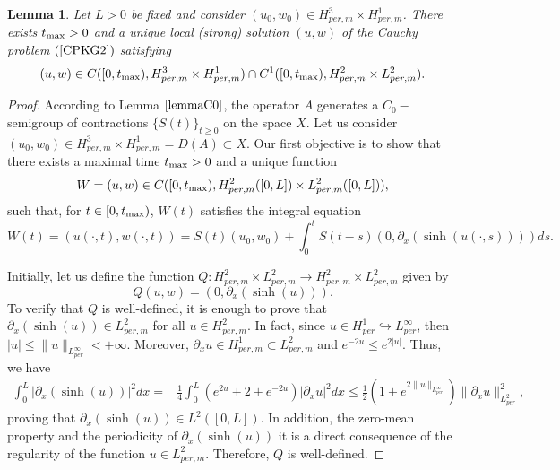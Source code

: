 \documentclass[12pt,reqno,a4paper]{amsart} %
\numberwithin{equation}{section}
\numberwithin{figure}{section}
\newtheorem{lemma}[theorem]{Lemma}
\begin{document}
\begin{lemma}\label{lwpthm1}
	Let $L>0$ be fixed and consider   $(u_0,w_0)\in H_{per,m}^3\times H_{per,m}^1$. There exists $t_{\rm{max}}>0$ and a unique local (strong) solution   $(u,w)$ of the Cauchy problem $(\ref{CPKG2})$ satisfying $$(u,w)\in C([0,t_{\rm{max}}),H_{per,m}^3\times H_{per,m}^1)\cap C^1([0,t_{\rm{max}}),H_{per,m}^2\times L_{per,m}^2) .$$
\end{lemma}
\begin{proof}	
	According to Lemma $\ref{lemmaC0}$, the operator $A$ generates a $C_0-$semigroup of 
	contractions $\{S(t)\}_{t\geq0}$ on the space $X$. Let us consider $(u_0,w_0)\in H_{per,m}^3\times H_{per,m}^1=D(A)\subset X$. Our first objective is to show that there exists a maximal time $t_{\rm{max}}>0$ and a unique function 
	\begin{equation}\label{eq1.lemma}
		W=(u,w)\in C([0,t_{\rm{max}}),H_{per,m}^2([0,L])\times L_{per,m}^2([0,L])), 
	\end{equation}
	such that, for $t\in [0,t_{\rm{max}})$, $W(t)$ satisfies the integral equation
	\begin{equation}\label{eq2.lemma}
		W(t)=(u(\cdot, t), w(\cdot, t))=S(t)(u_0,w_0)+\int_{0}^{t}S(t-s)(0,\partial_x(\sinh( u(\cdot,s))))ds. 
	\end{equation}
	
	Initially, let us define the function $Q:H_{per,m}^2\times L_{per,m}^2\rightarrow H_{per,m}^2\times L_{per,m}^2$ given by $$Q(u,w)=(0, \partial_x(\sinh(u))).$$ 
	To verify that $Q$ is well-defined, it is enough to prove that $\partial_x(\sinh(u))\in L_{per,m}^2 $ for all $u \in H_{per,m}^2$. In fact, since $u\in H_{per}^1 \hookrightarrow  L_{per}^\infty$, then $|u|\leq \|u\|_{L^\infty_{per}}<+\infty$. Moreover, 
	$\partial_x u\in H_{per,m}^1\subset L_{per,m}^2$ and $e^{-2u}\leq e^{2|u|}$. Thus, we have 
	\begin{align*}
		\int_{0}^{L}|\partial_x(\sinh(u))|^2dx%
		=&\frac{1}{4}\int_{0}^{L}(e^{2u}+2+e^{-2u})|\partial_xu|^2dx%
	  \leq   \frac{1}{2}(1+e^{2\|u\|_{L^\infty_{per}}})\|\partial_xu\|_{L^2_{per}}^2 ,
	\end{align*} proving that  $\partial_x(\sinh(u))\in L^2([0,L]) $. In addition, the zero-mean property and the periodicity of $\partial_x(\sinh(u))$ it is a direct consequence of the regularity of the function $u\in L_{per,m}^2$. Therefore, $Q$ is well-defined. 
	

\end{proof}
\end{document}
